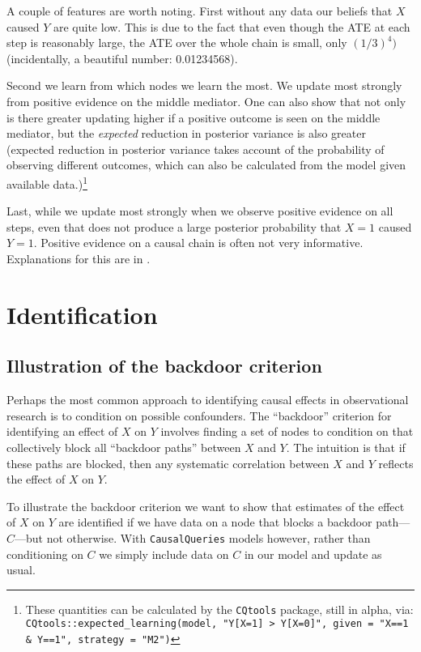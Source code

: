 \documentclass[
  12pt,
]{book}
\begin{document}
A couple of features are worth noting. First without any data our beliefs that \(X\) caused \(Y\) are quite low. This is due to the fact that even though the ATE at each step is reasonably large, the ATE over the whole chain is small, only \((1/3)^4)\) (incidentally, a beautiful number: 0.01234568).

Second we learn from which nodes we learn the most. We update most strongly from positive evidence on the middle mediator. One can also show that not only is there greater updating higher if a positive outcome is seen on the middle mediator, but the \emph{expected} reduction in posterior variance is also greater (expected reduction in posterior variance takes account of the probability of observing different outcomes, which can also be calculated from the model given available data.)\footnote{These quantities can be calculated by the \texttt{CQtools} package, still in alpha, via: \texttt{CQtools::expected\_learning(model,\ "Y{[}X=1{]}\ \textgreater{}\ Y{[}X=0{]}",\ given\ =\ "X==1\ \&\ Y==1",\ strategy\ =\ "M2")}}

Last, while we update most strongly when we observe positive evidence on all steps, even that does not produce a large posterior probability that \(X=1\) caused \(Y=1\). Positive evidence on a causal chain is often not very informative. Explanations for this are in \citet{dawid2019bounding}.

\hypertarget{identification}{%
\chapter{Identification}\label{identification}}

\hypertarget{illustration-of-the-backdoor-criterion}{%
\section{Illustration of the backdoor criterion}\label{illustration-of-the-backdoor-criterion}}

Perhaps the most common approach to identifying causal effects in observational research is to condition on possible confounders. The ``backdoor'' criterion for identifying an effect of \(X\) on \(Y\) involves finding a set of nodes to condition on that collectively block all ``backdoor paths'' between \(X\) and \(Y\). The intuition is that if these paths are blocked, then any systematic correlation between \(X\) and \(Y\) reflects the effect of \(X\) on \(Y\).

To illustrate the backdoor criterion we want to show that estimates of the effect of \(X\) on \(Y\) are identified if we have data on a node that blocks a backdoor path---\(C\)---but not otherwise. With \texttt{CausalQueries} models however, rather than conditioning on \(C\) we simply include data on \(C\) in our model and update as usual.
\end{document}
